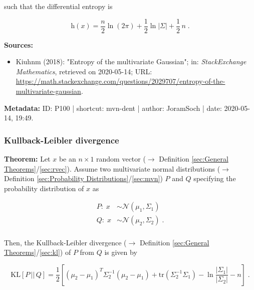 \documentclass[a4paper,12pt,twoside]{book}
\begin{document}
such that the differential entropy is

\begin{equation} \label{eq:mvn-dent-mvn-dent-qed}
\mathrm{h}(x) = \frac{n}{2} \ln(2\pi) + \frac{1}{2} \ln|\Sigma| + \frac{1}{2} \, n \; .
\end{equation}



\vspace{1em}
\textbf{Sources:}
\begin{itemize}
\item Kiuhnm (2018): "Entropy of the multivariate Gaussian"; in: \textit{StackExchange Mathematics}, retrieved on 2020-05-14; URL: \url{https://math.stackexchange.com/questions/2029707/entropy-of-the-multivariate-gaussian}.
\end{itemize}


\vspace{1em}
\textbf{Metadata:} ID: P100 | shortcut: mvn-dent | author: JoramSoch | date: 2020-05-14, 19:49.
\vspace{1em}



\subsubsection[\textbf{Kullback-Leibler divergence}]{Kullback-Leibler divergence} \label{sec:mvn-kl}
\setcounter{equation}{0}

\textbf{Theorem:} Let $x$ be an $n \times 1$ random vector ($\rightarrow$ Definition \ref{sec:General Theorems}/\ref{sec:rvec}). Assume two multivariate normal distributions ($\rightarrow$ Definition \ref{sec:Probability Distributions}/\ref{sec:mvn}) $P$ and $Q$ specifying the probability distribution of $x$ as

\begin{equation} \label{eq:mvn-kl-mvns}
\begin{split}
P: \; x &\sim \mathcal{N}(\mu_1, \Sigma_1) \\
Q: \; x &\sim \mathcal{N}(\mu_2, \Sigma_2) \; . \\
\end{split}
\end{equation}

Then, the Kullback-Leibler divergence ($\rightarrow$ Definition \ref{sec:General Theorems}/\ref{sec:kl}) of $P$ from $Q$ is given by

\begin{equation} \label{eq:mvn-kl-mvn-KL}
\mathrm{KL}[P\,||\,Q] = \frac{1}{2} \left[ (\mu_2 - \mu_1)^T \Sigma_2^{-1} (\mu_2 - \mu_1) + \mathrm{tr}(\Sigma_2^{-1} \Sigma_1) - \ln \frac{|\Sigma_1|}{|\Sigma_2|} - n \right] \; .
\end{equation}
\end{document}
